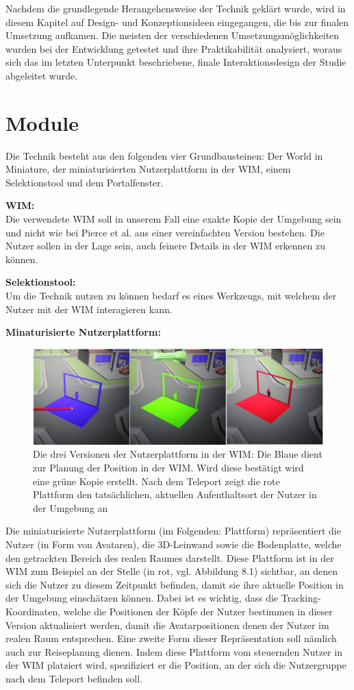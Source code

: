 Nachdem die grundlegende Herangehensweise der Technik geklärt wurde, wird in diesem Kapitel auf Design- und Konzeptionsideen eingegangen, die bis zur finalen Umsetzung aufkamen. Die meisten der verschiedenen Umsetzungsmöglichkeiten wurden bei der Entwicklung getestet und ihre Praktikabilität analysiert, woraus sich das im letzten Unterpunkt beschriebene, finale Interaktionsdesign der Studie abgeleitet wurde.

\section{Module}
Die Technik besteht aus den folgenden vier Grundbausteinen: Der World in Miniature, der miniaturisierten Nutzerplattform in der WIM, einem Selektionstool und dem Portalfenster.

\textbf{WIM:}\\
Die verwendete WIM soll in unserem Fall eine exakte Kopie der Umgebung sein und nicht wie bei Pierce et al. aus einer vereinfachten Version bestehen. Die Nutzer sollen in der Lage sein, auch feinere Details in der WIM erkennen zu können. 

 \textbf{Selektionstool:}\\
Um die Technik nutzen zu können bedarf es eines Werkzeugs, mit welchem der Nutzer mit der WIM interagieren kann. 

\textbf{Minaturisierte Nutzerplattform:}\\
\begin{figure}[h!]
  \centering
  \includegraphics[width=\textwidth]{images/platform_bgr.jpg}
  \caption{Die drei Versionen der Nutzerplattform in der WIM: Die Blaue dient zur Planung der Position in der WIM. Wird diese bestätigt wird eine grüne Kopie erstellt. Nach dem Teleport zeigt die rote Plattform den tatsächlichen, aktuellen Aufenthaltsort der Nutzer in der Umgebung an}
  \label{fig:todo}
\end{figure}
Die miniaturisierte Nutzerplattform (im Folgenden: Plattform) repräsentiert die Nutzer (in Form von Avataren), die 3D-Leinwand sowie die Bodenplatte, welche den getrackten Bereich des realen Raumes darstellt. Diese Plattform ist in der WIM zum Beispiel an der Stelle (in rot, vgl. Abbildung 8.1) sichtbar, an denen sich die Nutzer zu diesem Zeitpunkt befinden, damit sie ihre aktuelle Position in der Umgebung einschätzen können. Dabei ist es wichtig, dass die Tracking-Koordinaten, welche die Positionen der Köpfe der Nutzer bestimmen in dieser Version aktualisiert werden, damit die Avatarpositionen denen der Nutzer im realen Raum entsprechen. Eine zweite Form dieser Repräsentation soll nämlich auch zur Reiseplanung dienen. Indem diese Plattform vom steuernden Nutzer in der WIM platziert wird, spezifiziert er die Position, an der sich die Nutzergruppe nach dem Teleport befinden soll.

